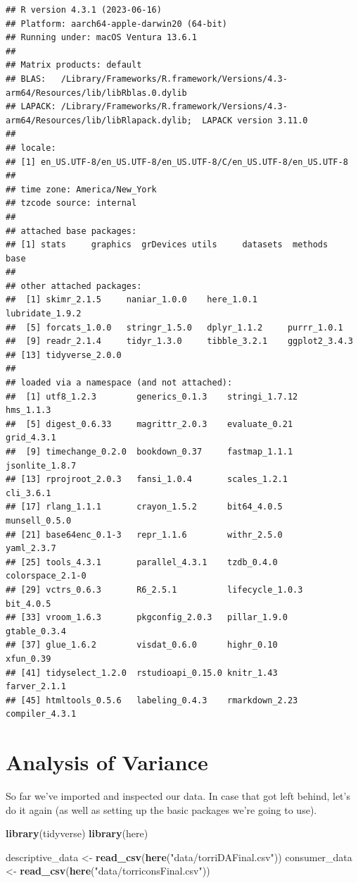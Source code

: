 \documentclass[
]{book}
\newenvironment{Shaded}{\begin{snugshade}}{\end{snugshade}}
\newcommand{\FunctionTok}[1]{\textcolor[rgb]{0.13,0.29,0.53}{\textbf{#1}}}
\newcommand{\NormalTok}[1]{#1}
\newcommand{\OtherTok}[1]{\textcolor[rgb]{0.56,0.35,0.01}{#1}}
\newcommand{\StringTok}[1]{\textcolor[rgb]{0.31,0.60,0.02}{#1}}
\begin{document}
\begin{verbatim}
## R version 4.3.1 (2023-06-16)
## Platform: aarch64-apple-darwin20 (64-bit)
## Running under: macOS Ventura 13.6.1
## 
## Matrix products: default
## BLAS:   /Library/Frameworks/R.framework/Versions/4.3-arm64/Resources/lib/libRblas.0.dylib 
## LAPACK: /Library/Frameworks/R.framework/Versions/4.3-arm64/Resources/lib/libRlapack.dylib;  LAPACK version 3.11.0
## 
## locale:
## [1] en_US.UTF-8/en_US.UTF-8/en_US.UTF-8/C/en_US.UTF-8/en_US.UTF-8
## 
## time zone: America/New_York
## tzcode source: internal
## 
## attached base packages:
## [1] stats     graphics  grDevices utils     datasets  methods   base     
## 
## other attached packages:
##  [1] skimr_2.1.5     naniar_1.0.0    here_1.0.1      lubridate_1.9.2
##  [5] forcats_1.0.0   stringr_1.5.0   dplyr_1.1.2     purrr_1.0.1    
##  [9] readr_2.1.4     tidyr_1.3.0     tibble_3.2.1    ggplot2_3.4.3  
## [13] tidyverse_2.0.0
## 
## loaded via a namespace (and not attached):
##  [1] utf8_1.2.3        generics_0.1.3    stringi_1.7.12    hms_1.1.3        
##  [5] digest_0.6.33     magrittr_2.0.3    evaluate_0.21     grid_4.3.1       
##  [9] timechange_0.2.0  bookdown_0.37     fastmap_1.1.1     jsonlite_1.8.7   
## [13] rprojroot_2.0.3   fansi_1.0.4       scales_1.2.1      cli_3.6.1        
## [17] rlang_1.1.1       crayon_1.5.2      bit64_4.0.5       munsell_0.5.0    
## [21] base64enc_0.1-3   repr_1.1.6        withr_2.5.0       yaml_2.3.7       
## [25] tools_4.3.1       parallel_4.3.1    tzdb_0.4.0        colorspace_2.1-0 
## [29] vctrs_0.6.3       R6_2.5.1          lifecycle_1.0.3   bit_4.0.5        
## [33] vroom_1.6.3       pkgconfig_2.0.3   pillar_1.9.0      gtable_0.3.4     
## [37] glue_1.6.2        visdat_0.6.0      highr_0.10        xfun_0.39        
## [41] tidyselect_1.2.0  rstudioapi_0.15.0 knitr_1.43        farver_2.1.1     
## [45] htmltools_0.5.6   labeling_0.4.3    rmarkdown_2.23    compiler_4.3.1
\end{verbatim}

\chapter{Analysis of Variance}\label{analysis-of-variance}

So far we've imported and inspected our data. In case that got left behind, let's do it again (as well as setting up the basic packages we're going to use).

\begin{Shaded}
\begin{Highlighting}[]
\FunctionTok{library}\NormalTok{(tidyverse)}
\FunctionTok{library}\NormalTok{(here)}

\NormalTok{descriptive\_data }\OtherTok{\textless{}{-}} \FunctionTok{read\_csv}\NormalTok{(}\FunctionTok{here}\NormalTok{(}\StringTok{"data/torriDAFinal.csv"}\NormalTok{))}
\NormalTok{consumer\_data }\OtherTok{\textless{}{-}} \FunctionTok{read\_csv}\NormalTok{(}\FunctionTok{here}\NormalTok{(}\StringTok{"data/torriconsFinal.csv"}\NormalTok{))}
\end{Highlighting}
\end{Shaded}
\end{document}
